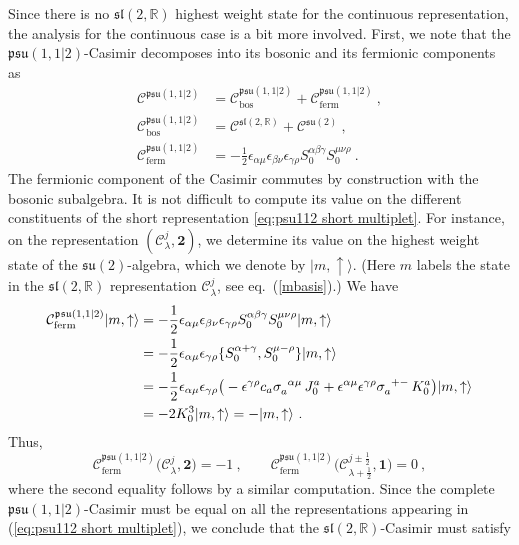 \documentclass[12pt,a4paper]{article}
\newcommand{\be}{\begin{equation}}
\newcommand{\ee}{\end{equation}}
\newcommand{\ket}[1]{| #1\rangle}
\begin{document}
Since there is no $\mathfrak{sl}(2,\mathds{R})$ highest weight state for the continuous representation, the analysis for the continuous case is a bit more involved. First, we note that the $\mathfrak{psu}(1,1|2)$-Casimir decomposes into its bosonic and its fermionic components as
\begin{align}
\mathcal{C}^{\mathfrak{psu}(1,1|2)}&=\mathcal{C}_\text{bos}^{\mathfrak{psu}(1,1|2)}+\mathcal{C}_\text{ferm}^{\mathfrak{psu}(1,1|2)}\ , \\
\mathcal{C}_\text{bos}^{\mathfrak{psu}(1,1|2)}&=\mathcal{C}^{\mathfrak{sl}(2,\mathds{R})}+\mathcal{C}^{\mathfrak{su}(2)}\ , \\
\mathcal{C}_\text{ferm}^{\mathfrak{psu}(1,1|2)}&=-\frac{1}{2} \epsilon_{\alpha\mu} \epsilon_{\beta\nu}\epsilon_{\gamma \rho} S_0^{\alpha\beta\gamma} S_0^{\mu\nu\rho}\ .
\end{align}
The fermionic component of the Casimir commutes by construction with the bosonic subalgebra. It is not difficult to compute its value on the different constituents of the short representation \eqref{eq:psu112 short multiplet}. For instance, on the representation $(\mathscr{C}^j_\lambda,\mathbf{2})$, we determine its value on the highest weight state of the $\mathfrak{su}(2)$-algebra, which we denote by $\ket{m,\uparrow}$. (Here $m$ labels the state in the $\mathfrak{sl}(2,\mathds{R})$ representation $\mathscr{C}^j_\lambda$, see eq.~(\ref{mbasis}).) We have
\begin{align}
\mathcal{C}_\text{ferm}^{\mathfrak{psu}(1,1|2)}\ket{m,\uparrow}&=-\frac{1}{2} \epsilon_{\alpha\mu} \epsilon_{\beta\nu}\epsilon_{\gamma \rho} S^{\alpha\beta\gamma}_0 S^{\mu\nu\rho}_0\ket{m,\uparrow} \\
&=-\frac{1}{2} \epsilon_{\alpha\mu} \epsilon_{\gamma \rho} \{S^{\alpha+\gamma}_0, S^{\mu-\rho}_0\} \ket{m,\uparrow} \\
&=-\frac{1}{2} \epsilon_{\alpha\mu} \epsilon_{\gamma \rho}\big(-\epsilon^{\gamma\rho} c_a\tensor{\sigma}{_a^{\alpha\mu}} \, J^a_0+\epsilon^{\alpha\mu}\epsilon^{\gamma\rho} \tensor{\sigma}{_a^{+-}} \, K^a_0\big)\ket{m,\uparrow} \\
&=-2 K^3_0 \ket{m,\uparrow} =- \ket{m,\uparrow}\ .
\end{align}
Thus, 
\be 
\mathcal{C}_\text{ferm}^{\mathfrak{psu}(1,1|2)}\big(\mathscr{C}^j_\lambda,\mathbf{2} \big)=-1\ , \qquad \mathcal{C}_\text{ferm}^{\mathfrak{psu}(1,1|2)}\big(\mathscr{C}^{j\pm \frac{1}{2}}_{\lambda+\frac{1}{2}},\mathbf{1} \big)=0\ ,
\ee
where the second equality follows by a similar computation. Since the complete $\mathfrak{psu}(1,1|2)$-Casimir must be equal on all the representations appearing in (\ref{eq:psu112 short multiplet}), we conclude that the $\mathfrak{sl}(2,\mathds{R})$-Casimir must satisfy
\end{document}
